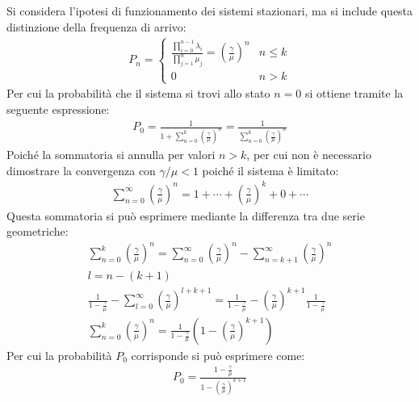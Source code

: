 \documentclass{article}
\numberwithin{equation}{subsection}
\begin{document}
Si considera l'ipotesi di funzionamento dei sistemi stazionari, ma si include questa distinzione della frequenza di arrivo:
\begin{gather*}
    P_n=\begin{cases}
        \displaystyle\frac{\displaystyle\prod_{i=0}^{n-1}\lambda_i}{\displaystyle\prod_{j=1}^{n}\mu_j}=\left(\frac{\gamma}{\mu}\right)^n &n\leq k\\
        0 &n>k
    \end{cases}
\end{gather*}
Per cui la probabilità che il sistema si trovi allo stato $n=0$ si ottiene tramite la seguente espressione:
\begin{gather*}
    P_0=\displaystyle\frac{1}{\displaystyle1+\sum_{n=0}^k\left(\frac{\gamma}{\mu}\right)^n}=\frac{1}{\displaystyle\sum_{n=0}^k\left(\frac{\gamma}{\mu}\right)^n}
\end{gather*}
Poiché la sommatoria si annulla per valori $n>k$, per cui non è necessario dimostrare la convergenza con $\gamma/\mu<1$ poiché il sistema è limitato: 
\begin{gather*}
    \displaystyle\sum_{n=0}^{\infty}\left(\frac{\gamma}{\mu}\right)^n=1+\cdots+\left(\frac{\gamma}{\mu}\right)^k+0+\cdots
\end{gather*}
Questa sommatoria si può esprimere mediante la differenza tra due serie geometriche:
\begin{gather*}
    \displaystyle\sum_{n=0}^k\left(\frac{\gamma}{\mu}\right)^n=\sum_{n=0}^{\infty}\left(\frac{\gamma}{\mu}\right)^n-\sum_{n=k+1}^{\infty}\left(\frac{\gamma}{\mu}\right)^n\\
    l=n-(k+1)\\
    \displaystyle\frac{1}{\displaystyle1-\frac{\gamma}{\mu}}-\sum_{l=0}^{\infty}\left(\frac{\gamma}{\mu}\right)^{l+k+1}=\displaystyle\frac{1}{\displaystyle1-\frac{\gamma}{\mu}}-\left(\frac{\gamma}{\mu}\right)^{k+1}\frac{1}{\displaystyle1-\frac{\gamma}{\mu}}\\
    \displaystyle\sum_{n=0}^k\left(\frac{\gamma}{\mu}\right)^n=\frac{1}{\displaystyle1-\frac{\gamma}{\mu}}\left(1-\left(\frac{\gamma}{\mu}\right)^{k+1}\right)
\end{gather*}
Per cui la probabilità $P_0$ corrisponde si può esprimere come:
\begin{gather}
    P_0=\displaystyle\frac{1-\displaystyle\frac{\gamma}{\mu}}{1-\displaystyle\left(\frac{\gamma}{\mu}\right)^{k+1}}
\end{gather}
\end{document}
